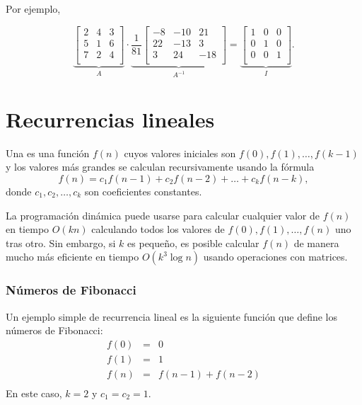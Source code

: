 Por ejemplo,

\[
\underbrace{
 \begin{bmatrix}
  2 & 4 & 3\\
  5 & 1 & 6\\
  7 & 2 & 4\\
 \end{bmatrix}
}_{A}
\cdot
\underbrace{
 \frac{1}{81}
 \begin{bmatrix}
   -8 & -10 & 21 \\
   22 & -13 & 3 \\
   3 & 24 & -18 \\
 \end{bmatrix}
}_{A^{-1}}
=
\underbrace{
 \begin{bmatrix}
  1 & 0 & 0 \\
  0 & 1 & 0 \\
  0 & 0 & 1 \\
 \end{bmatrix}
}_{I}.
\]

\section{Recurrencias lineales}


Una 
es una función $f(n)$
cuyos valores iniciales son
$f(0),f(1),\ldots,f(k-1)$
y los valores más grandes
se calculan recursivamente usando la fórmula
\[f(n) = c_1 f(n-1) + c_2 f(n-2) + \ldots + c_k f (n-k),\]
donde $c_1,c_2,\ldots,c_k$ son coeficientes constantes.

La programación dinámica puede usarse para calcular
cualquier valor de $f(n)$ en tiempo $O(kn)$ calculando
todos los valores de $f(0),f(1),\ldots,f(n)$ uno tras otro.
Sin embargo, si $k$ es pequeño, es posible calcular
$f(n)$ de manera mucho más eficiente en tiempo $O(k^3 \log n)$
usando operaciones con matrices.

\subsubsection{Números de Fibonacci}


Un ejemplo simple de recurrencia lineal es la
siguiente función que define los números de Fibonacci:
\[
\begin{array}{lcl}
f(0) & = & 0 \\
f(1) & = & 1 \\
f(n) & = & f(n-1)+f(n-2) \\
\end{array}
\]
En este caso, $k=2$ y $c_1=c_2=1$.

